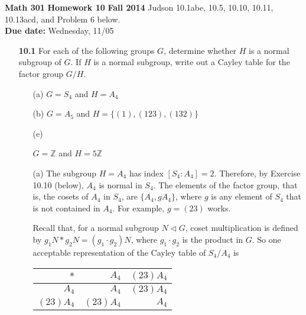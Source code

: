 \documentclass[12pt,reqno]{amsart}
\newcommand{\<}{\ensuremath{\langle}}
\renewcommand{\>}{\ensuremath{\rangle}}
\begin{document}
\thispagestyle{empty}

\noindent \textbf{Math 301} \hskip5cm {\bf Homework 10} \hfill {\bf Fall 2014}
\vskip1cm
 Judson 10.1abe, 10.5, 10.10, 10.11, 10.13acd, and
Problem 6 below.\\
{\bf Due date:} Wednesday, 11/05

\bigskip
\begin{enumerate}
\item[{\bf 10.1}] For each of the following groups $G$, determine whether $H$ is a normal
subgroup of $G$. If $H$ is a normal subgroup, write out a Cayley table
for the factor group $G/H$.
\begin{enumerate}
\item[(a)]
$G = S_4$ and $H = A_4$
 \item[(b)]
$G = A_5$ and $H = \{ (1), (123), (132) \}$
\item[(e)]

$G = {\mathbb Z}$ and $H = 5 {\mathbb Z}$
 
\end{enumerate}

\medskip
{} 
\begin{enumerate}
\item[(a)]
The subgroup $H = A_4$ has index $[S_4: A_4] = 2$.  Therefore, by Exercise 10.10
(below), $A_4$ is normal in $S_4$.  The elements of the factor group, that is,
the cosets of $A_4$ in $S_4$, are $\{A_4, gA_4\}$, where $g$ is any element of
$S_4$ that is not contained in $A_4$.  For example, $g = (23)$ works.  

Recall that, for a normal subgroup $N\triangleleft G$, coset
multiplication is defined by
$g_1N * g_2N = (g_1\cdot g_2) N$, where $g_1\cdot g_2$ is the product in $G$.
So one acceptable representation of the Cayley table of $S_4/A_4$ is

\medskip
\begin{center}
\begin{tabular}{r|rr}
  $*$ & $A_4$ &$(23)A_4$ \\
\hline
  $A_4$ & $A_4$ &$(23)A_4$ \\
  $(23)A_4$ & $(23)A_4$ &$A_4$
\end{tabular}
\end{center}
\medskip


\end{enumerate}
\end{enumerate}
\end{document}
